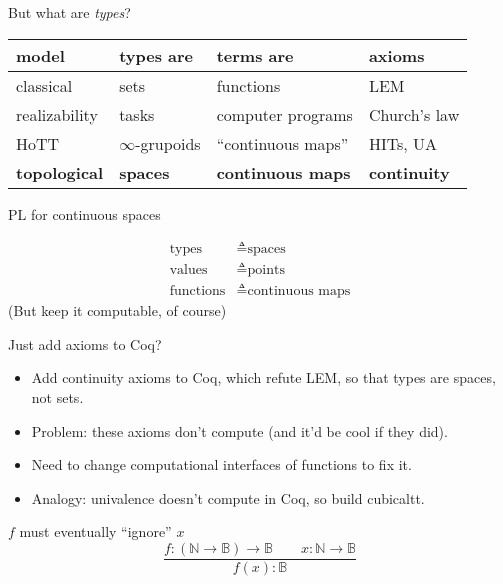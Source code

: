 \documentclass[14pt]{beamer}
\newcommand{\nat}{\mathbb{N}}
\newcommand{\bool}{\mathbb{B}}
\begin{document}
\begin{frame}{But what are \emph{types}?}
\small

\begin{table}[]
\centering
\begin{tabular}{l | l l l}
model                & types are         & terms are                 & axioms              \\
\hline
classical            & sets              & functions                & LEM                 \\
realizability                  & tasks             & computer programs        & Church's law              \\
HoTT                 & $\infty$-grupoids & ``continuous maps''      & HITs, UA               \\
\textbf{topological} & \textbf{spaces}   & \textbf{continuous maps} & \textbf{continuity}
\end{tabular}
\end{table}

\end{frame}

\begin{frame}{PL for continuous spaces}

\begin{center}
{
\Large
\begin{align*}
\text{types} &\triangleq \text{spaces}
\\
\text{values} &\triangleq \text{points}
\\
\text{functions} &\triangleq \text{continuous maps}
\end{align*}
}
(But keep it computable, of course)
\end{center}
\end{frame}

\begin{frame}{Just add axioms to Coq?}
\begin{itemize}
\item Add continuity axioms to Coq, which refute LEM, so that types are spaces, not sets.
\item Problem: these axioms don't compute (and it'd be cool if they did).
\item Need to change computational interfaces of functions to fix it. 
\item Analogy: univalence doesn't compute in Coq, so build cubicaltt.
\end{itemize}
\end{frame}

\begin{frame}{$f$ must eventually ``ignore'' $x$}
\Large
\[
\frac{
f : (\nat \to \bool) \to \bool
\qquad
x : \nat \to \bool
}
{ f(x) : \bool }
\]
\end{frame}
\end{document}
